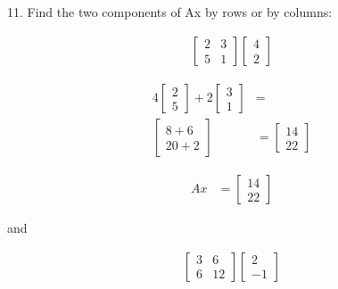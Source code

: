 \documentclass[paper=a4, fontsize=10pt]{scrartcl} %
\begin{document}
\subsection*{}
\setcounter{equation}{0}
11. Find the two components of Ax by rows or by columns:

	\begin{align*}
		\begin{bmatrix}
			2 & 3 \\
			5 & 1
		\end{bmatrix}
		\begin{bmatrix}
			4 \\
			2
		\end{bmatrix}
	\end{align*}

	\begin{align*}
		4 \begin{bmatrix}
			2 \\ 5
		\end{bmatrix}
		+ 2 \begin{bmatrix}
			3 \\ 1
		\end{bmatrix}
		&= \\
		\begin{bmatrix}
			8 + 6 \\ 20 + 2
		\end{bmatrix}
		&=
		\begin{bmatrix}
			14 \\ 22
		\end{bmatrix}
	\end{align*}

	\begin{align}
		Ax &= \begin{bmatrix}
			14 \\ 22
		\end{bmatrix}
	\end{align}

	    and

	\begin{align*}
		\begin{bmatrix}
			3 & 6 \\
			6 & 12
		\end{bmatrix}
		\begin{bmatrix}
			2 \\
			-1
		\end{bmatrix}
	\end{align*}
\end{document}
